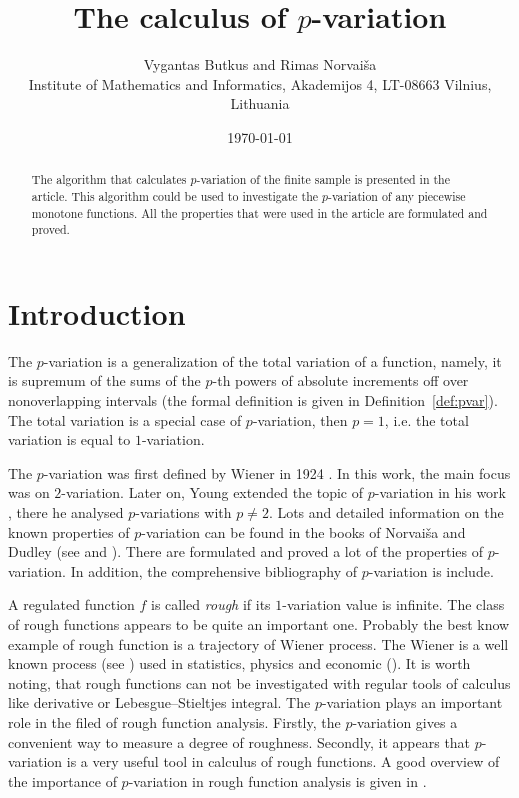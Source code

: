 \documentclass[12pt, a4paper]{article}
\title{The calculus of $p$-variation }
\author{Vygantas Butkus and Rimas Norvaiša \\
\small{Institute of Mathematics and Informatics, Akademijos 4, LT-08663 Vilnius, Lithuania}}
\date{\today}
\numberwithin{equation}{section}
\begin{document}
\maketitle

\begin{abstract}
The algorithm that calculates $p$-variation of
the finite sample is presented in the article. 
This algorithm could be used to investigate
the $p$-variation of any piecewise monotone functions.
All the properties that were used in the article 
are formulated and proved.
\end{abstract}



\section{Introduction}


The $p$-variation is a generalization of the total variation of a function,
namely, it is supremum of the sums of the $p$-th
powers of absolute increments off over nonoverlapping intervals 
(the formal definition is given in Definition~\ref{def:pvar}).
The total variation is a special case of $p$-variation, then 
$p=1$, i.e. the total variation is equal to $1$-variation.

The $p$-variation was first defined by Wiener in 1924 \cite{Wiener1924}.
In this work, the main focus was on $2$-variation. 
Later on, Young extended
the topic of $p$-variation in his work \cite{Young1936}, there 
he analysed $p$-variations with $p \neq 2$. 
Lots and detailed information on the known properties 
of $p$-variation can be found in the books of  Norvaiša and
Dudley (see \cite{DudleyNorvaisa1998} and \cite{DudleyNorvaisa1999}). 
There are formulated and proved a lot of the properties of $p$-variation.
In addition, the comprehensive bibliography of $p$-variation is include.

A regulated function $f$ is called \emph{rough}
if its $1$-variation value is infinite.
The class of rough functions appears to be quite an important one.
Probably the best know example of rough function is 
a trajectory of Wiener process. 
The Wiener is a well known process (see \cite{Karatsas1997}) 
used in statistics, physics and economic (\cite{Econ1997}).
It is worth noting, that rough functions 
can not be investigated 
with regular tools of calculus like
derivative or Lebesgue–Stieltjes integral.
The $p$-variation plays an important role in the filed of
rough function analysis. 
Firstly, the $p$-variation gives a convenient way to measure 
a degree of roughness. 
Secondly, it appears that $p$-variation is a very useful tool 
in calculus of rough functions.
A good overview of the importance of $p$-variation in rough function
analysis is given in \cite{Norvaisa2005}.
 
\end{document}
